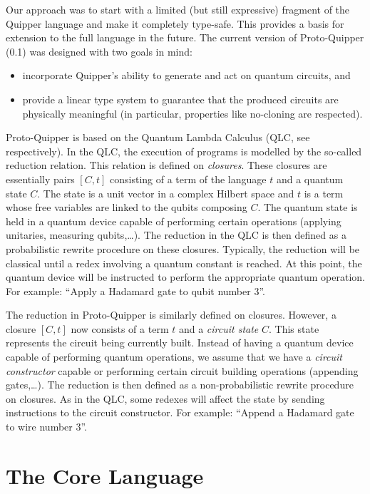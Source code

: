 \documentclass{article}
\begin{document}
Our approach was to start with a limited (but still expressive) 
fragment of the Quipper language and make it completely type-safe. 
This provides a basis for extension to the full language in the 
future. The current version of Proto-Quipper (0.1) was designed 
with two goals in mind: 
\begin{itemize}
  \item incorporate Quipper's ability to generate and act on 
  quantum circuits, and 
  \item provide a linear type system to guarantee that the 
  produced circuits are physically meaningful (in particular, 
  properties like no-cloning are respected).
\end{itemize}
Proto-Quipper is based on the Quantum Lambda Calculus (QLC, see 
\cite{SeVa09} respectively). In the QLC, the execution 
of programs is modelled by the so-called reduction relation. This 
relation is defined on \emph{closures}. These closures are 
essentially pairs $[C,t]$ consisting of a term of the language 
$t$ and a quantum state $C$. The state is a unit vector in a 
complex Hilbert space and $t$ is a term whose free variables are 
linked to the qubits composing $C$. The quantum state is held in 
a quantum device capable of performing certain operations 
(applying unitaries, measuring qubits,\ldots). The reduction in 
the QLC is then defined as a probabilistic rewrite procedure on 
these closures. Typically, the reduction will be classical until 
a redex involving a quantum constant is reached. At this point, 
the quantum device will be instructed to perform the appropriate 
quantum operation. For example: ``Apply a Hadamard gate to qubit 
number 3''. 

The reduction in Proto-Quipper is similarly defined on closures. 
However, a closure $[C,t]$ now consists of a term $t$ and a 
\emph{circuit state} $C$. This state represents the circuit being 
currently built. Instead of having a quantum device capable of 
performing quantum operations, we assume that we have a 
\emph{circuit constructor} capable or performing certain circuit 
building operations (appending gates,\ldots). The reduction is 
then defined as a non-probabilistic rewrite procedure on closures. 
As in the QLC, some redexes will affect the state by sending 
instructions to the circuit constructor. For example: ``Append a 
Hadamard gate to wire number 3''.


\section{The Core Language}
\end{document}
